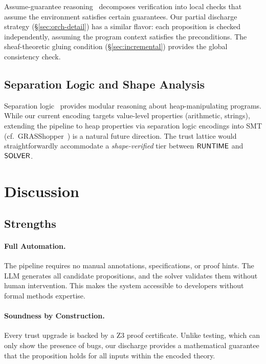 \documentclass[11pt]{article}
\begin{document}
Assume-guarantee reasoning~\cite{AssumeGuarantee1985} decomposes
verification into local checks that assume the environment satisfies
certain guarantees.  Our partial discharge strategy
(\S\ref{sec:orch-detail}) has a similar flavor: each proposition is
checked independently, assuming the program context satisfies the
preconditions.  The sheaf-theoretic gluing condition
(\S\ref{sec:incremental}) provides the global consistency check.

\subsection{Separation Logic and Shape Analysis}

Separation logic~\cite{SepLogic2002} provides modular reasoning about
heap-manipulating programs.  While our current encoding targets
value-level properties (arithmetic, strings), extending the pipeline
to heap properties via separation logic encodings into SMT
(cf.\ GRASShopper~\cite{GRASShopper2014}) is a natural future direction.
The trust lattice would straightforwardly accommodate a
\emph{shape-verified} tier between $\mathsf{RUNTIME}$ and $\mathsf{SOLVER}$.

\section{Discussion}\label{sec:discussion}

\subsection{Strengths}

\paragraph{Full Automation.}
The pipeline requires no manual annotations, specifications, or proof
hints.  The LLM generates all candidate propositions, and the solver
validates them without human intervention.  This makes the system
accessible to developers without formal methods expertise.

\paragraph{Soundness by Construction.}
Every trust upgrade is backed by a Z3 proof certificate.  Unlike
testing, which can only show the presence of bugs, our discharge
provides a mathematical guarantee that the proposition holds for all
inputs within the encoded theory.
\end{document}
